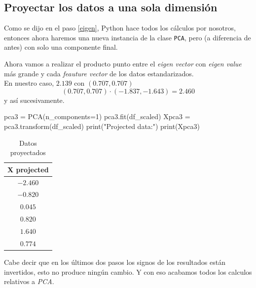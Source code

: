 \subsection{Proyectar los datos a una sola dimensión}
Como se dijo en el paso \ref{eigen}, Python hace todos los cálculos por nosotros, entonces ahora haremos una nueva instancia de la clase \texttt{PCA}, pero (a diferencia de antes) con solo una componente final.\\[0.75em]
\begin{minipage}[c]{0.48\textwidth}
Ahora vamos a realizar el producto punto entre el \textit{eigen vector} con \textit{eigen value} más grande y cada \textit{feauture vector} de los datos estandarizados.\\

En nuestro caso, $2.139$ con $(0.707, 0.707)$
\[ (0.707, 0.707)\cdot(-1.837,-1.643)=2.460 \]
y así sucesivamente.
\end{minipage}
\hfill\vrule\hfill
\begin{minipage}[c]{0.48\textwidth}
\begin{jupyter}{9}
pca3 = PCA(n_components=1)
pca3.fit(df_scaled)
Xpca3 = pca3.transform(df_scaled)
print("Projected data:")
print(Xpca3)
\end{jupyter}
\end{minipage}
\begin{table}[H]
\centering
\begin{tabular}{c}
\sffamily X projected \\ \hline
\rowcolor[HTML]{EFEFEF} 
$-2.460$ \\
$-0.820$ \\
\rowcolor[HTML]{EFEFEF} 
$0.045$ \\
$0.820$ \\
\rowcolor[HTML]{EFEFEF} 
$1.640$ \\
$0.774$
\end{tabular}
\caption{Datos proyectados}
\label{tab:projected}
\end{table}
Cabe decir que en los últimos dos pasos los signos de los resultados están invertidos, esto no produce ningún cambio. Y con eso acabamos todos los calculos relativos a \textit{PCA}.
